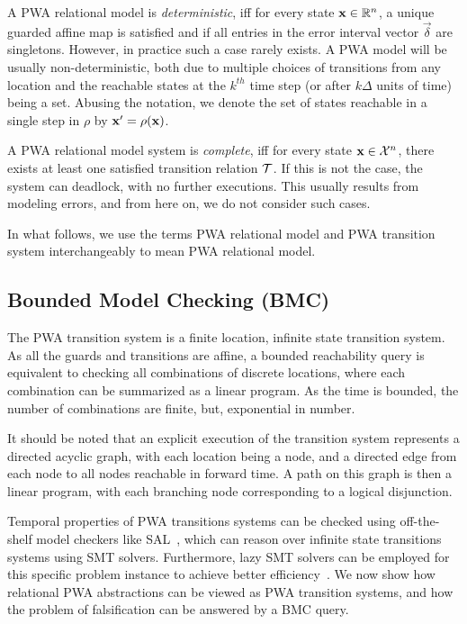 
A PWA relational model is \textit{deterministic}, iff for every state
$\mathbf{x}\in\mathbb{R}^n$, a unique guarded affine map is satisfied and if all
entries in the error interval vector $\vec{\delta}$ are singletons.
However, in practice such a case rarely exists. A PWA model will be
usually non-deterministic, both due to multiple choices of transitions
from any location and the reachable states at the $k^{th}$ time step
(or after $k\Delta$ units of time) being a set.  Abusing the notation,
we denote the set of states reachable in a single step in $\rho$ by
$\mathbf{x}' = \rho(\mathbf{x})$.

A PWA relational model system is \textit{complete}, iff for every
state $\mathbf{x}\in\mathcal{X}^n$, there exists at least one satisfied
transition relation $\mathcal{T}$. If this is not the case, the system can
deadlock, with no further executions. This usually results from
modeling errors, and from here on, we do not consider such cases.

In what follows, we use the terms PWA relational model and PWA
transition system interchangeably to mean PWA relational model.

\subsection{Bounded Model Checking (BMC)}
The PWA transition system is a finite location, infinite state
transition system. As all the guards and transitions are affine, a
bounded reachability query is equivalent to checking all
combinations of discrete locations, where each combination can be
summarized as a linear program. As the time is bounded, the number of
combinations are finite, but, exponential in number.

It should be noted that an explicit execution of the transition system
represents a directed acyclic graph, with each location being a node,
and a directed edge from each node to all nodes reachable in forward
time. A path on this graph is then a linear program, with each
branching node corresponding to a logical disjunction.

Temporal properties of PWA transitions systems can be checked using
off-the-shelf model checkers like SAL~\cite{SAL-SRI}, which can reason
over infinite state transitions systems using SMT solvers.
Furthermore, lazy SMT solvers can be employed for this specific
problem instance to achieve better efficiency~\cite{shoukry2017smc}.
We now show how relational PWA abstractions can be viewed as PWA
transition systems, and how the problem of falsification can
be answered by a BMC query.


